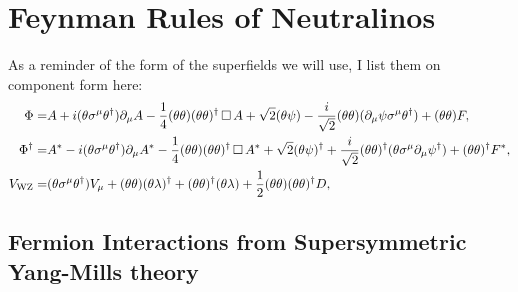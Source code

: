 \documentclass[../main.tex]{subfiles}
\begin{document}
\section{Feynman Rules of Neutralinos}

\begin{temporary}
  As a reminder of the form of the superfields we will use, I list them on component form here:
  \begin{subequations}
    \begin{align}
      \Phi =         & A + i(\theta\sigma^\mu\theta^\dagger) \partial_\mu A - \frac{1}{4} (\theta\theta)(\theta\theta)^\dagger \operatorname{\Box} A +
      \sqrt{2} (\theta\psi) - \frac{i}{\sqrt{2}} (\theta\theta) (\partial_\mu \psi \sigma^\mu \theta^\dagger) + (\theta\theta) F,                     \\
      \Phi^\dag =    & A^\ast - i(\theta\sigma^\mu\theta^\dagger) \partial_\mu A^\ast - \frac{1}{4} (\theta\theta)(\theta\theta)^\dagger \operatorname{\Box} A^\ast +
      \sqrt{2} (\theta\psi)^\dagger + \frac{i}{\sqrt{2}} (\theta\theta)^\dagger
      (\theta \sigma^\mu \partial_\mu \psi^\dagger) + (\theta\theta)^\dagger F^\ast,                                                                  \\
      {V}_\text{WZ} = & (\theta\sigma^\mu\theta^\dagger) V_\mu + (\theta\theta) (\theta\lambda)^\dagger +
      (\theta\theta)^\dagger(\theta\lambda) + \frac{1}{2}
      (\theta\theta)(\theta\theta)^\dagger D,
    \end{align}
  \end{subequations}
\end{temporary}

\subsection{Fermion Interactions from Supersymmetric Yang-Mills theory}
\end{document}
